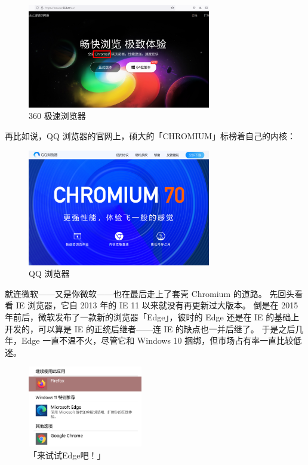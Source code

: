 \begin{figure}[htb!]
  \centering
  \includegraphics[width=8cm]{assets/360_ee.png}
  \caption{360 极速浏览器}
  \label{360_ee}
\end{figure}

再比如说，QQ 浏览器的官网上，硕大的「CHROMIUM」标榜着自己的内核：

\begin{figure}[htb!]
  \centering
  \includegraphics[width=8cm]{assets/QQ_Browser.png}
  \caption{QQ 浏览器}
  \label{QQ_Browser}
\end{figure}

就连微软——又是你微软——也在最后走上了套壳 Chromium 的道路。
先回头看看 IE 浏览器，它自 2013 年的 IE 11 以来就没有再更新过大版本。
倒是在 2015 年前后，微软发布了一款新的浏览器「Edge」，彼时的 Edge 还是在 IE 的基础上开发的，可以算是 IE 的正统后继者——连 IE 的缺点也一并后继了。
于是之后几年，Edge 一直不温不火，尽管它和 Windows 10 捆绑，但市场占有率一直比较低迷。

\begin{figure}
  \centering
  \includegraphics[width=5cm]{assets/Recommend_Edge.png}
  \caption{「来试试Edge吧！」}
  \label{Recommend_Edge}
\end{figure}

